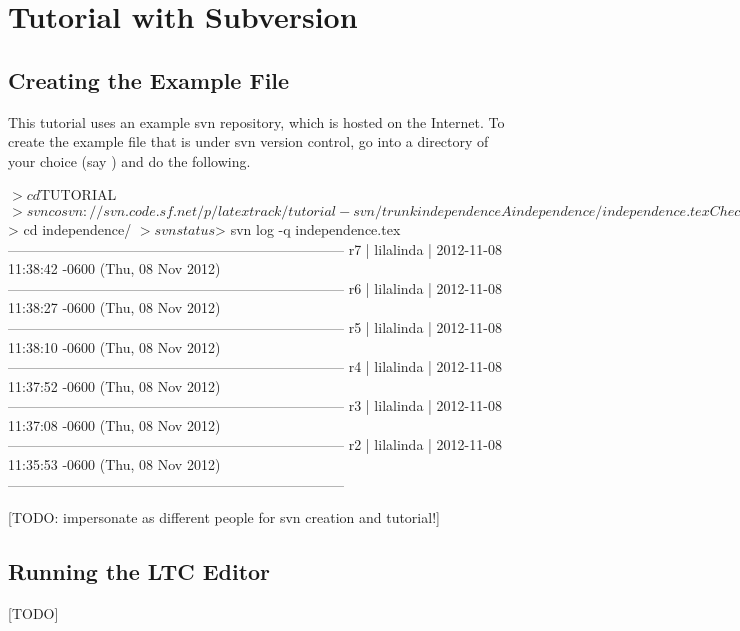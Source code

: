 \chapter{Tutorial with Subversion} \label{ch:tutorial-svn}

\section{Creating the Example File}

This tutorial uses an example svn repository, which is hosted on the Internet.  To create the example file that is under svn version control, go into a directory of your choice (say ) and do the following.

\begin{CodeVerbatim}
$> cd $TUTORIAL
$> svn co svn://svn.code.sf.net/p/latextrack/tutorial-svn/trunk independence
A    independence/independence.tex
Checked out revision 7.
$> cd independence/
$> svn status
$> svn log -q independence.tex 
------------------------------------------------------------------------
r7 | lilalinda | 2012-11-08 11:38:42 -0600 (Thu, 08 Nov 2012)
------------------------------------------------------------------------
r6 | lilalinda | 2012-11-08 11:38:27 -0600 (Thu, 08 Nov 2012)
------------------------------------------------------------------------
r5 | lilalinda | 2012-11-08 11:38:10 -0600 (Thu, 08 Nov 2012)
------------------------------------------------------------------------
r4 | lilalinda | 2012-11-08 11:37:52 -0600 (Thu, 08 Nov 2012)
------------------------------------------------------------------------
r3 | lilalinda | 2012-11-08 11:37:08 -0600 (Thu, 08 Nov 2012)
------------------------------------------------------------------------
r2 | lilalinda | 2012-11-08 11:35:53 -0600 (Thu, 08 Nov 2012)
------------------------------------------------------------------------
\end{CodeVerbatim}

[TODO: impersonate as different people for svn creation and tutorial!]

\section{Running the LTC Editor}

[TODO]
